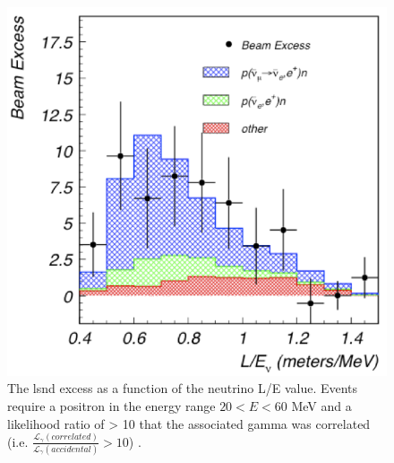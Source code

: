 \begin{figure}[h!]
    \centering
    \includegraphics[width = \largefigwidth]{figures-chap2/LSND_excess.png}
    \caption[LSND excsess.]{The \gls{lsnd} excess as a function of the neutrino L/E value. Events require a positron in the energy range $20 < E < 60$ MeV and a likelihood ratio of > 10 that the associated gamma was correlated (i.e. $\frac{\mathcal{L}_{\gamma}(correlated)}{\mathcal{L}_{\gamma}(accidental)} > 10$) \cite{LSND_excess}.}
    \label{fig:LSND excess}
\end{figure}
\newpage

